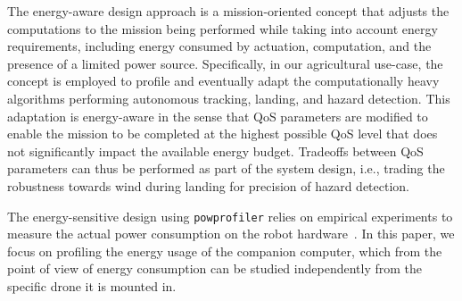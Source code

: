 \documentclass[conference]{IEEEtran}
\newcommand{\stt}[1]{{\small\tt #1}} %
\newcommand{\powprof}{\stt{powprofiler}}
\begin{document}
The energy-aware design approach is a mission-oriented concept that adjusts
the computations to the mission being performed while taking into
account energy requirements, including energy consumed by actuation,
computation, and the presence of a limited power source. Specifically,
in our agricultural use-case, the concept is employed to profile and eventually adapt the
computationally heavy algorithms performing autonomous tracking,
landing, and hazard detection. This adaptation is energy-aware
in the sense that QoS parameters are modified
to enable the mission to be completed at the highest possible QoS
level that does not significantly impact the available energy budget. Tradeoffs
between QoS parameters can thus be performed as part of the system design, i.e., trading
the robustness towards wind during landing for precision of hazard
detection.

The energy-sensitive design using \powprof{} relies on empirical
experiments to measure the actual power consumption on the robot
hardware~\cite{seewald2019coarse}.
%
In this paper, we focus on 
profiling the energy usage of the companion computer,
which from the point of view of energy consumption
can be studied independently from the specific drone it is mounted in.
\end{document}
